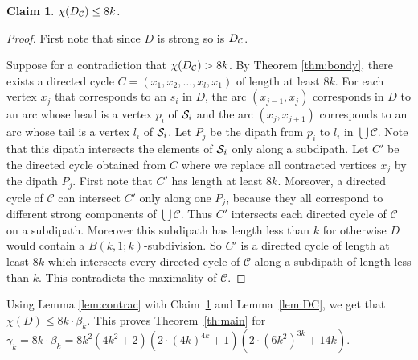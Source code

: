 \documentclass[utf8,10pt]{article}
\theoremstyle{plain}
\newtheorem{claim}{Claim}[theorem]
\theoremstyle{definition}
\theoremstyle{remark}
\newcommand{\col}{(6k^2)^{3k}}
\begin{document}
\begin{claim}\label{cl:nocycle}
$\chi(D_{\cal C}) \leq 8k$.
\end{claim} 

\begin{proof}
First note that since $D$ is strong so is $D_{\cal C}$. 

Suppose for a contradiction that $\chi(D_{\cal C}) > 8k$. By Theorem \ref{thm:bondy}, there exists
a directed cycle $C = (x_1, x_2, \dots , x_l, x_1)$ of length at least $8k$. 	
For each vertex $x_j$ that corresponds to an $s_i$ in $D$, the arc $(x_{j-1},x_j)$ corresponds in $D$ to an arc whose head is a vertex $p_i$ of ${\cal S}_i$ and the arc $(x_j,x_{j+1})$ corresponds to an arc whose tail is a vertex $l_i$ of ${\cal S}_i$. Let $P_j$ be the dipath 
		from $p_i$ to $l_i$ in $\bigcup \mathcal{C}$. Note that this dipath intersects the elements of ${\cal S}_i$ only along a subdipath. 
Let $C'$ be the directed cycle obtained from $C$ where we replace all contracted vertices $x_j$ by the dipath $P_j$. 
First note that $C'$ has length at least $8k$. Moreover, a directed cycle of $\mathcal{C}$  can
intersect $C'$ only along one $P_j$, because they all correspond to different strong components of $\bigcup \mathcal{C}$. Thus $C'$ intersects  each directed cycle of $\mathcal{C}$ on a subdipath. Moreover this subdipath has length less than $k$ for otherwise $D$ would contain 
a $B(k,1;k)$-subdivision. So $C'$ is a directed cycle of length at least $8k$ which intersects every directed cycle of $\mathcal{C}$ along a 
subdipath of length less than $k$. This contradicts the maximality of $\mathcal{C}$.
\end{proof}


Using Lemma \ref{lem:contrac} with
Claim~\ref{cl:nocycle} and Lemma~\ref{lem:DC}, we get that $\chi(D) \leq 8k \cdot \beta_k$.
This proves Theorem~\ref{th:main} for $\gamma_k=8k\cdot \beta_k = 8k^2(4k^2+2)(2\cdot (4k)^{4k} + 1) (2\cdot \col + 14k)$.
\end{document}
